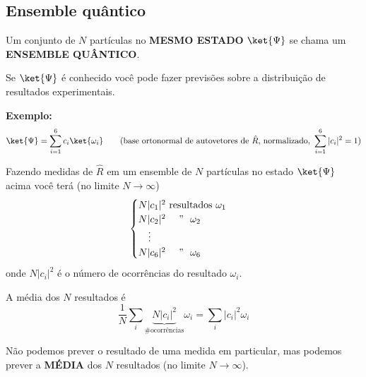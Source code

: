 \subsection*{Ensemble quântico}

Um conjunto de $N$ partículas no \textbf{MESMO ESTADO} $\ket{\Psi}$ se chama um \textbf{ENSEMBLE QUÂNTICO}.

Se $\ket{\Psi}$ é conhecido você pode fazer previsões sobre a distribuição de resultados experimentais.

\textbf{Exemplo:}
\begin{equation}
    \ket{\Psi} = \sum_{i=1}^{6} c_i \ket{\omega_i} \qquad \text{(base ortonormal de autovetores de $\hat{R}$, normalizado, } \sum_{i=1}^{6}|c_i|^2 = 1 \text{)}
\label{eq:aula12_estado_ensemble}
\end{equation}

Fazendo medidas de $\hat{R}$ em um ensemble de $N$ partículas no estado $\ket{\Psi}$ acima você terá (no limite $N\to\infty$)
\begin{equation}
    \begin{cases}
        N|c_1|^2 \text{ resultados } \omega_1 \\
        N|c_2|^2 \text{ \quad ''\ \ } \omega_2 \\
        \quad \vdots \\
        N|c_6|^2 \text{ \quad ''\ \ } \omega_6
    \end{cases}
\label{eq:aula12_ocorrencias}
\end{equation}
onde $N|c_i|^2$ é o número de ocorrências do resultado $\omega_i$.

A média dos $N$ resultados é
\begin{equation}
    \frac{1}{N}\sum_i \underbrace{N|c_i|^2}_{\text{\# ocorrências}} \omega_i = \sum_i |c_i|^2 \omega_i
\label{eq:aula12_media_ocorrencias}
\end{equation}

Não podemos prever o resultado de uma medida em particular, mas podemos prever a \textbf{MÉDIA} dos $N$ resultados (no limite $N\to\infty$).

\begin{center}
\end{center}

